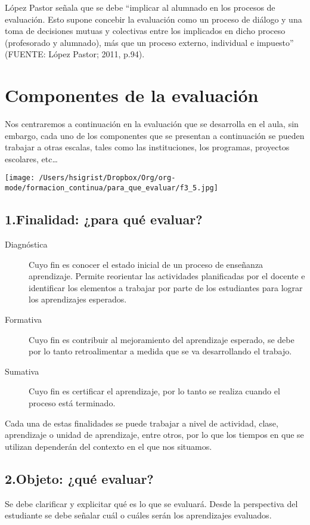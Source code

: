 \documentclass[12pt,letterpaper,article,x11names]{memoir}
\begin{document}
López Pastor señala que se debe “implicar al alumnado en los procesos de evaluación. Esto supone concebir la evaluación como un proceso de diálogo y una toma de decisiones mutuas y colectivas entre los implicados en dicho proceso (profesorado y alumnado), más que un proceso externo, individual e impuesto” (FUENTE: López Pastor; 2011, p.94).

\section{Componentes de la evaluación}
\label{sec:orgdaaeafa}
Nos centraremos a continuación en la evaluación que se desarrolla en el aula, sin embargo, cada uno de los componentes que se presentan a continuación se pueden trabajar a otras escalas, tales como las instituciones, los programas, proyectos escolares, etc…

\begin{center}
\texttt{[image: /Users/hsigrist/Dropbox/Org/org-mode/formacion\_continua/para\_que\_evaluar/f3\_5.jpg]}
\end{center}


\subsection{1.Finalidad: ¿para qué evaluar?}
\label{sec:org8695847}
\begin{description}
\item[{Diagnóstica}] Cuyo fin es conocer el estado inicial de un proceso de enseñanza aprendizaje. Permite reorientar las actividades planificadas por el docente e identificar los elementos a trabajar por parte de los estudiantes para lograr los aprendizajes esperados.
\item[{Formativa}] Cuyo fin es contribuir al mejoramiento del aprendizaje esperado, se debe por lo tanto retroalimentar a medida que se va desarrollando el trabajo.
\item[{Sumativa}] Cuyo fin es certificar el aprendizaje, por lo tanto se realiza cuando el proceso está terminado.
\end{description}

Cada una de estas finalidades se puede trabajar a nivel de actividad, clase, aprendizaje o unidad de aprendizaje, entre otros, por lo que los tiempos en que se utilizan dependerán del contexto en el que nos situamos.

\subsection{2.Objeto: ¿qué evaluar?}
\label{sec:org6cb52d6}
Se debe clarificar y explicitar qué es lo que se evaluará. Desde la perspectiva del estudiante se debe señalar cuál o cuáles serán los aprendizajes evaluados.
\end{document}
